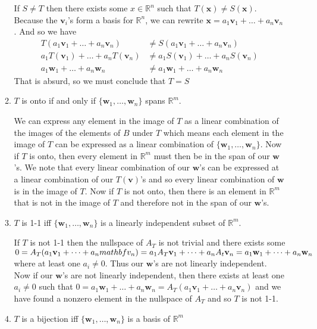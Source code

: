 \documentclass[letterpaper]{article}
\begin{document}
\begin{enumerate}
\begin{enumerate}
  If $S\ne T$ then there exists some $x\in \mathbb{R}^n$ such that $T(\mathbf{x})\ne S(\mathbf{x})$. Because the $\mathbf{v}_i$'s form a basis for $\mathbb{R}^n$, we can rewrite $\mathbf{x}=a_1\mathbf{v}_1+\dots+a_n\mathbf{v}_n$. And so we have
  \begin{align*}
    T(a_1\mathbf{v}_1+\dots+a_n\mathbf{v}_n)
    &\ne S(a_1\mathbf{v}_1+\dots+a_n\mathbf{v}_n)\\
    a_1T(\mathbf{v}_1)+\dots+a_nT(\mathbf{v}_n)
    &\ne a_1S(\mathbf{v}_1)+\dots+a_nS(\mathbf{v}_n)\\
    a_1\mathbf{w}_1+\dots+a_n\mathbf{w}_n
    &\ne a_1\mathbf{w}_1+\dots+a_n\mathbf{w}_n
  \end{align*}
  That is absurd, so we must conclude that $T=S$
  \item
  $T$ is onto if and only if $\{\mathbf{w}_1,\dots,\mathbf{w}_n\}$ spans $\mathbb{R}^m$.

  We can express any element in the image of $T$ as a linear combination of the images of the elements of $B$ under $T$ which means each element in the image of $T$ can be expressed as a linear combination of $\{\mathbf{w}_1,\dots,\mathbf{w}_n\}$. Now if $T$ is onto, then every element in $\mathbb{R}^m$ must then be in the span of our $\mathbf{w}$'s. We note that every linear combination of our $\mathbf{w}$'s can be expressed at a linear combination of our $T(\mathbf{v})$'s and so every linear combination of $\mathbf{w}$ is in the image of $T$. Now if $T$ is not onto, then there is an element in $\mathbb{R}^m$ that is not in the image of $T$ and therefore not in the span of our $\mathbf{w}$'s.
  \item
  $T$ is 1-1 iff $\{\mathbf{w}_1,\dots,\mathbf{w}_n\}$ is a linearly independent subset of $\mathbb{R}^m$.

  If $T$ is not 1-1 then the nullspace of $A_T$ is not trivial and there exists some $0=A_T(a_1\mathbf{v}_1+\dots+a_n\\mathbf{v}_n)=a_1A_T\mathbf{v}_1+\dots+a_nA_t\mathbf{v}_n=a_1\mathbf{w}_1+\dots+a_n\mathbf{w}_n$ where at least one $a_i\ne 0$. Thus our $\mathbf{w}$'s are not linearly independent. Now if our $\mathbf{w}$'s are not linearly independent, then there exists at least one $a_i\ne0$ such that $0=a_1\mathbf{w}_1+\dots+a_n\mathbf{w}_n=A_T(a_1\mathbf{v}_1+\dots+a_n\mathbf{v}_n)$ and we have found a nonzero element in the nullspace of $A_T$ and so $T$ is not 1-1.
  \item
  $T$ is a bijection iff $\{\mathbf{w}_1,\dots,\mathbf{w}_n\}$ is a basis of $\mathbb{R}^m$


\end{enumerate}
\end{enumerate}
\end{document}
